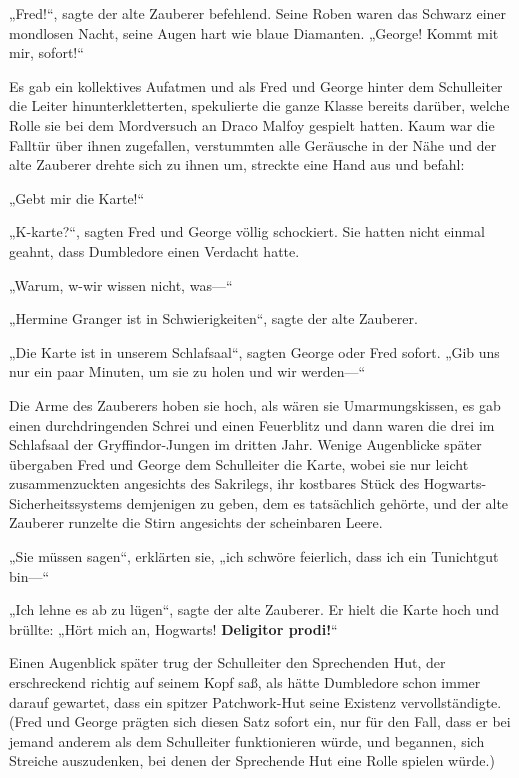 {„Fred!“, sagte der alte Zauberer befehlend. Seine Roben waren das Schwarz einer mondlosen Nacht, seine Augen hart wie blaue Diamanten. „George! Kommt mit mir, sofort!“

Es gab ein kollektives Aufatmen und als Fred und George hinter dem Schulleiter die Leiter hinunterkletterten, spekulierte die ganze Klasse bereits darüber, welche Rolle sie bei dem Mordversuch an Draco Malfoy gespielt hatten. Kaum war die Falltür über ihnen zugefallen, verstummten alle Geräusche in der Nähe und der alte Zauberer drehte sich zu ihnen um, streckte eine Hand aus und befahl:

„Gebt mir die Karte!“

„K-karte?“, sagten Fred und George völlig schockiert. Sie hatten nicht einmal geahnt, dass Dumbledore einen Verdacht hatte.

„Warum, w-wir wissen nicht, was—“

„Hermine Granger ist in Schwierigkeiten“, sagte der alte Zauberer.

„Die Karte ist in unserem Schlafsaal“, sagten George oder Fred sofort. „Gib uns nur ein paar Minuten, um sie zu holen und wir werden—“

Die Arme des Zauberers hoben sie hoch, als wären sie Umarmungskissen, es gab einen durchdringenden Schrei und einen Feuerblitz und dann waren die drei im Schlafsaal der Gryffindor-Jungen im dritten Jahr. Wenige Augenblicke später übergaben Fred und George dem Schulleiter die Karte, wobei sie nur leicht zusammenzuckten angesichts des Sakrilegs, ihr kostbares Stück des Hogwarts-Sicherheitssystems demjenigen zu geben, dem es tatsächlich gehörte, und der alte Zauberer runzelte die Stirn angesichts der scheinbaren Leere.

„Sie müssen sagen“, erklärten sie, „ich schwöre feierlich, dass ich ein Tunichtgut bin—“

„Ich lehne es ab zu lügen“, sagte der alte Zauberer. Er hielt die Karte hoch und brüllte: „Hört mich an, Hogwarts! \textbf{Deligitor prodi!}“

Einen Augenblick später trug der Schulleiter den Sprechenden Hut, der erschreckend richtig auf seinem Kopf saß, als hätte Dumbledore schon immer darauf gewartet, dass ein spitzer Patchwork-Hut seine Existenz vervollständigte. (Fred und George prägten sich diesen Satz sofort ein, nur für den Fall, dass er bei jemand anderem als dem Schulleiter funktionieren würde, und begannen, sich Streiche auszudenken, bei denen der Sprechende Hut eine Rolle spielen würde.)

}
